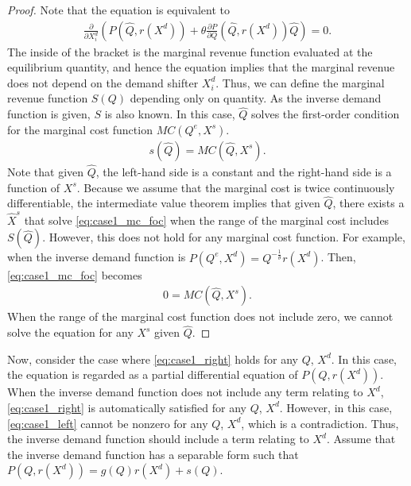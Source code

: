 \documentclass[11pt, a4paper]{article}
\theoremstyle{remark}
\begin{document}
\begin{proof}
    Note that the equation is equivalent to
    \begin{align}
        \frac{\partial}{\partial X^{d}_i}\left( P(\hat{Q}, r(X^{d})) + \theta\frac{\partial P}{\partial Q}(\hat{Q}, r(X^{d}))\hat{Q}\right) = 0.
    \end{align}
    The inside of the bracket is the marginal revenue function evaluated at the equilibrium quantity, and hence the equation implies that the marginal revenue does not depend on the demand shifter $X^{d}_i$.
    Thus, we can define the marginal revenue function $S(Q)$ depending only on quantity.
    As the inverse demand function is given, $S$ is also known.
    In this case, $\hat{Q}$ solves the first-order condition for the marginal cost function $MC(Q^e, X^{s})$.
    \begin{align}
        s(\hat{Q}) =  MC(\hat{Q}, X^{s}). \label{eq:case1_mc_foc}
    \end{align}
    Note that given $\hat{Q}$, the left-hand side is a constant and the right-hand side is a function of $X^{s}$.
    Because we assume that the marginal cost is twice continuously differentiable, the intermediate value theorem implies that given $\hat{Q}$, there exists a $\hat{X}^{s}$ that solve \eqref{eq:case1_mc_foc} when the range of the marginal cost includes $S(\hat{Q})$.    
    However, this does not hold for any marginal cost function.
    For example, when the inverse demand function is $P(Q^e, X^{d}) = Q^{-\frac{1}{\theta}}r(X^{d})$.
    Then, \eqref{eq:case1_mc_foc} becomes
    \begin{align}
        0 = MC(\hat{Q}, X^{s}).
    \end{align}
    When the range of the marginal cost function does not include zero, we cannot solve the equation for any $X^{s}$ given $\hat{Q}$.
\end{proof}



Now, consider the case where \eqref{eq:case1_right} holds for any $Q$, $X^{d}$.
In this case, the equation is regarded as a partial differential equation of $P(Q, r(X^{d}))$.
When the inverse demand function does not include any term relating to $X^{d}$, \eqref{eq:case1_right} is automatically satisfied for any $Q$, $X^{d}$.
However, in this case, \eqref{eq:case1_left} cannot be nonzero for any $Q$, $X^{d}$, which is a contradiction.
Thus, the inverse demand function should include a term relating to $X^{d}$.
Assume that the inverse demand function has a separable form such that $P(Q, r(X^{d})) = g(Q)r(X^{d}) + s(Q)$.
\end{document}
